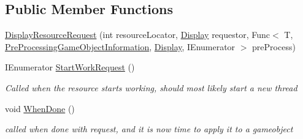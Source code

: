 \subsection*{Public Member Functions}
\begin{DoxyCompactItemize}
\item 
\mbox{\hyperlink{class_display_resource_request_a97001a4fd6ca62ee0c1a2e99f8ad3567}{Display\+Resource\+Request}} (int resource\+Locator, \mbox{\hyperlink{class_display}{Display}} requestor, Func$<$ T, \mbox{\hyperlink{class_pre_processing_game_object_information}{Pre\+Processing\+Game\+Object\+Information}}, \mbox{\hyperlink{class_display}{Display}}, I\+Enumerator $>$ pre\+Process)
\item 
I\+Enumerator \mbox{\hyperlink{class_display_resource_request_ab447f9d42e473b8bc8839c6f3d306a17}{Start\+Work\+Request}} ()
\begin{DoxyCompactList}\small\item\em Called when the resource starts working, should most likely start a new thread \end{DoxyCompactList}\item 
void \mbox{\hyperlink{class_display_resource_request_a60a8a75088ba20c6c42ebcab8309f1de}{When\+Done}} ()
\begin{DoxyCompactList}\small\item\em called when done with request, and it is now time to apply it to a gameobject \end{DoxyCompactList}\end{DoxyCompactItemize}
